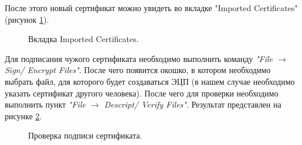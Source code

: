 \documentclass[10pt,a4paper]{report}
\begin{document}
После этого новый сертификат можно увидеть во вкладке "Imported Certificates"  (рисунок \ref{ris:step42}).

\begin{figure}[h]
	\caption{Вкладка Imported Certificates.}
	\label{ris:step42}
\end{figure}

Для подписания чужого сертификата необходимо выполнить команду \textit{"File \begin{math}\to\end{math} Sign/ Encrypt Files"}. После чего появится окошко, в котором необходимо выбрать файл, для которого будет создаваться ЭЦП (в нашем случае необходимо указать сертификат другого человека). После чего для проверки необходимо выполнить пункт \textit{"File \begin{math}\to\end{math} Descript/ Verify Files"}. Результат представлен на рисунке \ref{ris:step43}.

\begin{figure}[h]
	\caption{Проверка подписи сертификата.}
	\label{ris:step43}
\end{figure}
\end{document}
